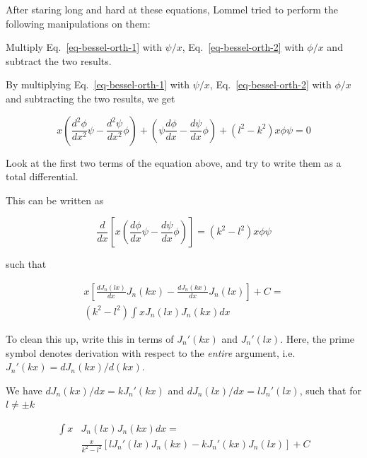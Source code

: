 After staring long and hard at these equations, Lommel tried to perform the following manipulations on them:

\begin{cue}
Multiply Eq.~\ref{eq-bessel-orth-1} with $\psi/x$, Eq.~\ref{eq-bessel-orth-2} with $\phi/x$ and subtract the two results.  
\end{cue}

By multiplying Eq.~\ref{eq-bessel-orth-1} with $\psi/x$, Eq.~\ref{eq-bessel-orth-2} with $\phi/x$ and subtracting the two results, we get

\begin{equation}
x \left( \frac{d^2 \phi}{dx^2}\psi - \frac{d^2 \psi}{dx^2} \phi \right) + \left(\psi \frac{d \phi}{dx}- \frac{d \psi}{dx}\phi\right) + \left(l^2 - k^2\right) x \phi \psi = 0
\end{equation}

\begin{cue}
Look at the first two terms of the equation above, and try to write them as a total differential. 
\end{cue}

This can be written as

\begin{equation}
\frac{d}{dx}\left[x \left( \frac{d \phi}{dx} \psi - \frac{d \psi}{dx} \phi\right)\right] = \left(k^2 - l^2\right) x \phi \psi
\end{equation}

such that

\begin{align}
x \left[{\frac{dJ_n(lx)}{dx}  J_n(kx) - \frac{dJ_n(kx)}{dx} J_n(lx)}\right] + C = \nonumber \\ \left(k^2 - l^2\right)\int x J_n(lx)J_n(kx)dx
\end{align}

\begin{cue}
To clean this up, write this in terms of $J_n'(kx)$ and  $J_n'(lx)$. Here, the prime symbol denotes derivation with respect to the \emph{entire} argument, i.e. $J_n'(kx)=dJ_n(kx)/d(kx)$. 
\end{cue}

We have $dJ_n(kx)/dx = kJ_n'(kx)$ and $dJ_n(lx)/dx = lJ_n'(lx)$, such that for $l \ne \pm k$

\begin{align}
  \int x & J_n(lx)J_n(kx)dx = \nonumber \\
  & \frac{x}{k^2 - l^2} \left[{l J_n'(lx) J_n(kx) -  k J_n'(kx) J_n(lx)}\right] + C \label{eq-lommel-1}
\end{align} 

